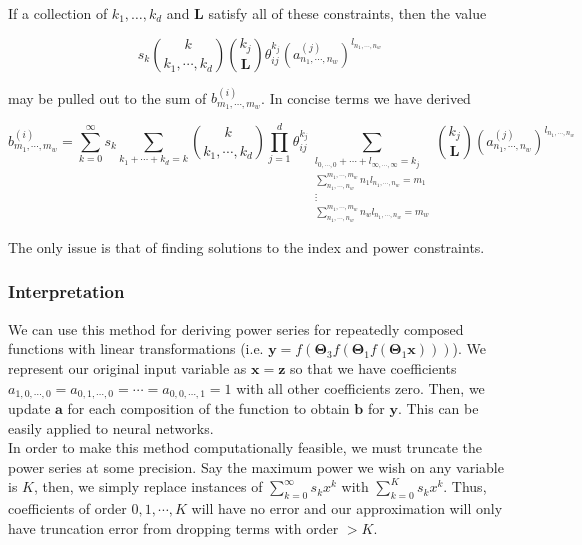 If a collection of $k_1, \ldots, k_d$ and $\mathbf{L}$ satisfy all of these constraints, then the value

\begin{equation*}
    s_k \binom{k}{k_1, \cdots, k_d} \binom{k_j}{\mathbf{L}} \theta_{ij}^{k_j} (a^{(j)}_{n_1, \cdots, n_w})^{l_{n_1, \cdots, n_w}}
\end{equation*}

may be pulled out to the sum of $b^{(i)}_{m_1, \cdots, m_w}$. In concise terms we have derived

\begin{equation}
    b^{(i)}_{m_1, \cdots, m_w} = \sum_{k=0}^{\infty} s_k \sum_{k_1 + \cdots + k_d = k} \binom{k}{k_1, \cdots, k_d} \prod_{j=1}^{d} \theta_{ij}^{k_j} \sum_{\substack{l_{0, \cdots, 0} + \cdots + l_{\infty, \cdots, \infty} = k_j \\ \sum_{n_1, \cdots, n_w}^{m_1, \cdots, m_w} n_1 l_{n_1, \cdots, n_w} = m_1 \\ \vdots \\ \sum_{n_1, \cdots, n_w}^{m_1, \cdots, m_w} n_w l_{n_1, \cdots, n_w} = m_w}} \binom{k_j}{\mathbf{L}} (a^{(j)}_{n_1, \cdots, n_w})^{l_{n_1, \cdots, n_w}}
\end{equation}

The only issue is that of finding solutions to the index and power constraints.

\subsubsection{Interpretation}

We can use this method for deriving power series for repeatedly composed functions with linear transformations (i.e. $\mathbf{y} = f(\mathbf{\Theta}_3 f(\mathbf{
\Theta}_1 f(\mathbf{\Theta}_1 \mathbf{x})))$). We represent our original input variable as $\mathbf{x} = \mathbf{z}$ so that we have coefficients $a_{1, 0, \cdots, 0} = a_{0, 1, \cdots, 0} = \cdots = a_{0, 0, \cdots, 1} = 1$ with all other coefficients zero. Then, we update $\mathbf{a}$ for each composition of the function to obtain $\mathbf{b}$ for $\mathbf{y}$. This can be easily applied to neural networks.\\

In order to make this method computationally feasible, we must truncate the power series at some precision. Say the maximum power we wish on any variable is $K$, then, we simply replace instances of $\sum_{k=0}^{\infty} s_k x^k$ with $\sum_{k=0}^{K} s_k x^k$. Thus, coefficients of order $0, 1, \cdots, K$ will have no error and our approximation will only have truncation error from dropping terms with order $> K$.

